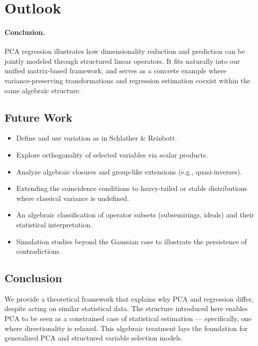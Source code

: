 \section{Outlook}

\paragraph{Conclusion.}
PCA regression illustrates how dimensionality reduction and prediction can be jointly modeled through structured linear operators. It fits naturally into our unified matrix-based framework, and serves as a concrete example where variance-preserving transformations and regression estimation coexist within the same algebraic structure.

\subsection{Future Work}
\begin{itemize}
    \item Define and use variation as in Schlather \& Reinbott.
    \item Explore orthogonality of selected variables via scalar products.
    \item Analyze algebraic closures and group-like extensions (e.g., quasi-inverses).
    \item Extending the coincidence conditions to heavy-tailed or stable distributions 
    where classical variance is undefined. 
    \item An algebraic classification of operator subsets (subsemirings, ideals) 
    and their statistical interpretation. 
    \item Simulation studies beyond the Gaussian case to illustrate 
    the persistence of contradictions. 
\end{itemize}

\subsection{Conclusion}
We provide a theoretical framework that explains why PCA and regression differ, despite acting on similar statistical data. The structure introduced here enables PCA to be seen as a constrained case of statistical estimation — specifically, one where directionality is relaxed. This algebraic treatment lays the foundation for generalized PCA and structured variable selection models.